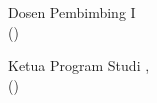 \begin{center}

    
    
  
    
\begin{minipage}{.5\textwidth}
    \begin{center}
        Dosen Pembimbing I\\[1.75cm]
    
    
    (\pembimbing)\\
    \pembimbingNIDN
        
    \end{center}
\end{minipage}%
    
    
        


\vfill  

    
    Ketua Program Studi \program, \\[1.75cm]
    
    
    (\kaprodi) \\
    \kaprodiNIDN
    
    
\end{center}




\newpage